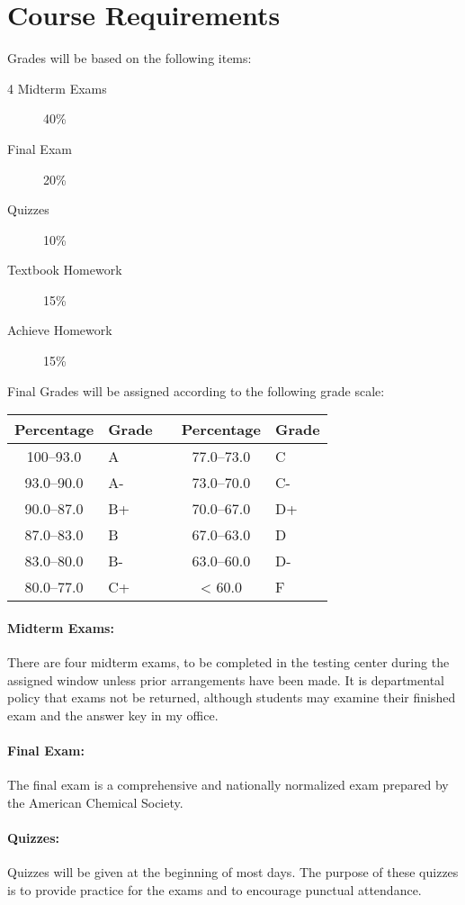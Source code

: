 \documentclass[12pt, letterpaper]{article}
\begin{document}
\section*{Course Requirements}
Grades will be based on the following items:
\begin{description}
	\item[4 Midterm Exams] 40\%
	\item[Final Exam] 20\%
	\item[Quizzes] 10\%
	\item[Textbook Homework] 15\%
	\item[Achieve Homework] 15\%
\end{description}
Final Grades will be assigned according to the following grade scale:

\begin{tabular}{cl|c|cl}
	Percentage & Grade &  & Percentage & Grade \\ \midrule
	100--93.0  & A     &  & 77.0--73.0 & C     \\
	93.0--90.0 & A-    &  & 73.0--70.0 & C-    \\
	90.0--87.0 & B+    &  & 70.0--67.0 & D+    \\
	87.0--83.0 & B     &  & 67.0--63.0 & D     \\
	83.0--80.0 & B-    &  & 63.0--60.0 & D-    \\
	80.0--77.0 & C+    &  & < 60.0     & F
\end{tabular}
\paragraph{Midterm Exams:}
There are four midterm exams, to be completed in the testing center during the assigned window unless prior arrangements have been made. It is departmental policy that exams not be returned, although students may examine their finished exam and the answer key in my office.

\paragraph{Final Exam:}
The final exam is a comprehensive and nationally normalized exam prepared by the American Chemical Society.

\paragraph{Quizzes:}
Quizzes will be given at the beginning of most days. The purpose of these quizzes is to provide practice for the exams and to encourage punctual attendance.
\end{document}
